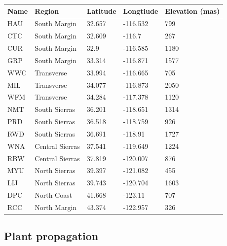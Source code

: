 \documentclass[11pt, oneside]{article}
\begin{document}
\begin{table}[ht]
   \centering
   \begin{tabular}{@{} lllll @{}}
      \toprule
  Name& Region  & Latitude  & Longtiude  & Elevation (mas) \\
      \midrule
	HAU & South Margin & 32.657	& 
    -116.532	& 799   \\
	CTC	& South Margin & 32.609 & 
    -116.7	& 267   \\
	CUR	& South Margin & 32.9 & 
    -116.585	& 1180   \\
	GRP & South Margin & 33.314 &
    -116.871	& 1577   \\
	WWC &	Transverse & 33.994 & 
    -116.665	& 705   \\
	MIL	& Transverse & 34.077 & 
    -116.873	& 2050   \\
	WFM	& Transverse & 34.284 & 
    -117.378	& 1120   \\
	NMT	& South Sierras & 36.201 & 
    -118.651	& 1314   \\
	PRD	& South Sierras & 36.518 & 
    -118.759	& 926   \\
	RWD	& South Sierras & 36.691 & 
    -118.91	& 1727   \\
	WNA	& Central Sierras & 37.541 & 
    -119.649	& 1224   \\
	RBW	& Central Sierras	& 37.819 & 
    -120.007	& 876   \\
	MYU	& North Sierras	& 39.397 & 
    -121.082	& 455   \\
	LIJ	& North Sierras	& 39.743 & 
    -120.704	& 1603   \\
	DPC	& North Coast & 41.668 & 
    -123.11	& 707   \\
	RCC	& North Margin & 43.374 & 
    -122.957	& 326   \\
	\bottomrule
	\end{tabular}
	\label{table:Table_FocalPops}
\end{table}

\subsection*{Plant propagation}
\end{document}
